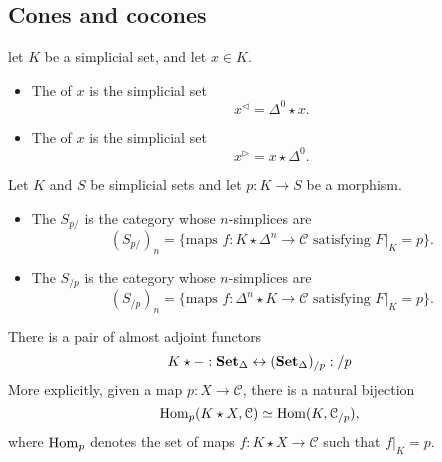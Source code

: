 \documentclass[main.tex]{subfiles}
\begin{document}
\subsection{Cones and cocones}
\label{ssc:cones_and_cocones}

\begin{definition}
  \label{def:left_cone_right_cone}
  let $K$ be a simplicial set, and let $x \in K$.
  \begin{itemize}
    \item The  of $x$ is the simplicial set
      \begin{equation*}
        x^{\triangleleft} = \Delta^{0} \star x.
      \end{equation*}

    \item The  of $x$ is the simplicial set
      \begin{equation*}
        x^{\triangleright} = x \star \Delta^{0}.
      \end{equation*}
  \end{itemize}
\end{definition}


\begin{definition}
  \label{def:overcategory}
  Let $K$ and $S$ be simplicial sets and let $p\colon K \to S$ be a morphism.
  \begin{itemize}
    \item The  $S_{p/}$ is the category whose $n$-simplices are
      \begin{equation*}
        (S_{p/})_{n} = \{\text{maps }f\colon K \star \Delta^{n} \to \mathcal{C} \text{ satisfying }F|_{K} = p\}.
      \end{equation*}

    \item The  $S_{/p}$ is the category whose $n$-simplices are
      \begin{equation*}
        (S_{/p})_{n} = \{\text{maps }f\colon \Delta^{n} \star K \to \mathcal{C} \text{ satisfying }F|_{K} = p\}.
      \end{equation*}
  \end{itemize}
\end{definition}

\begin{theorem}
  There is a pair of almost adjoint functors
  \begin{equation*}
    K \star - : \operatorname{\mathbf{Set}_{\Delta}} \leftrightarrow (\operatorname{\mathbf{Set}_{\Delta}})_{/p} : /p
  \end{equation*}
  More explicitly, given a map $p\colon X \to \mathcal{C}$, there is a natural bijection
  \begin{equation*}
    \operatorname{Hom}_{p}(K \star X, \mathcal{C}) \simeq \operatorname{Hom}(K, \mathcal{C}_{/p}),
  \end{equation*}
  where $\operatorname{Hom}_{p}$ denotes the set of maps $f\colon K \star X \to \mathcal{C}$ such that $f|_{K} = p$.
\end{theorem}
\end{document}

